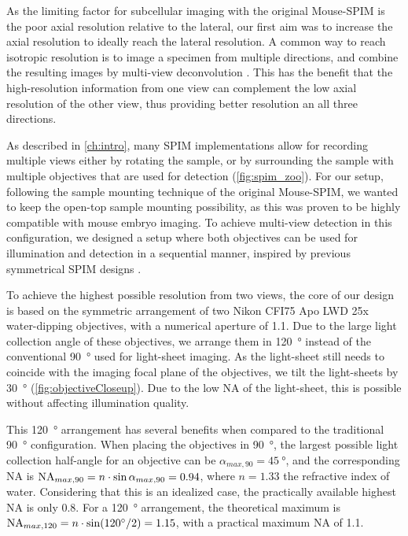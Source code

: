   As the limiting factor for subcellular imaging with the original Mouse-SPIM is the poor axial resolution relative to the lateral, our first aim was to increase the axial resolution to ideally reach the lateral resolution. A common way to reach isotropic resolution is to image a specimen from multiple directions, and combine the resulting images by multi-view deconvolution \cite{swoger_multi-view_2007,temerinac-ott_multiview_2012, preibisch_efficient_2014}. This has the benefit that the high-resolution information from one view can complement the low axial resolution of the other view, thus providing better resolution an all three directions.

  As described in \autoref{ch:intro}, many SPIM implementations allow for recording multiple views either by rotating the sample, or by surrounding the sample with multiple objectives that are used for detection (\autoref{fig:spim_zoo}). For our setup, following the sample mounting technique of the original Mouse-SPIM, we wanted to keep the open-top sample mounting possibility, as this was proven to be highly compatible with mouse embryo imaging. To achieve multi-view detection in this configuration, we designed a setup where both objectives can be used for illumination and detection in a sequential manner, inspired by previous symmetrical SPIM designs \cite{balazs_development_2013, wu_spatially_2013}.

  To achieve the highest possible resolution from two views, the core of our design is based on the symmetric arrangement of two Nikon CFI75 Apo LWD 25x water-dipping objectives, with a numerical aperture of 1.1. Due to the large light collection angle of these objectives, we arrange them in \SI{120}{\degree} instead of the conventional \SI{90}{\degree} used for light-sheet imaging. As the light-sheet still needs to coincide with the imaging focal plane of the objectives, we tilt the light-sheets by \SI{30}{\degree} (\autoref{fig:objectiveCloseup}). Due to the low NA of the light-sheet, this is possible without affecting illumination quality.

  This \SI{120}{\degree} arrangement has several benefits when compared to the traditional \SI{90}{\degree} configuration. When placing the objectives in \SI{90}{\degree}, the largest possible light collection half-angle for an objective can be $\alpha_{max,90} =\SI{45}{\degree}$, and the corresponding NA is $\operatorname{NA}_{max,90} = n \cdot \sin \alpha_{max,90} = 0.94$, where $n=1.33$ the refractive index of water. Considering that this is an idealized case, the practically available highest NA is only 0.8. For a \SI{120}{\degree} arrangement, the theoretical maximum is $\na_{max,120} = n \cdot \sin (\SI{120}{\degree} /2) = 1.15$, with a practical maximum NA of 1.1.

